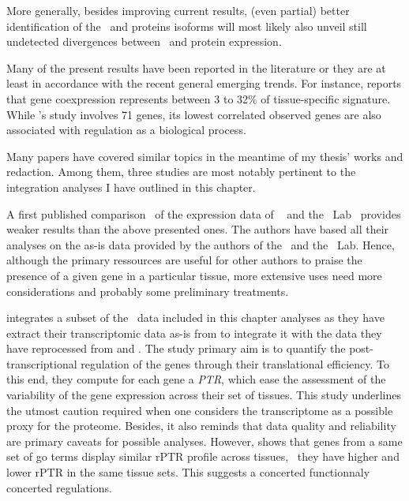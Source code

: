 More generally,
besides improving current results,
(even partial) better identification of the \mRNAs\ and proteins isoforms
will most likely also unveil still undetected divergences
between \mRNA\ and protein expression.\mybr\

Many of the present results have been reported in the literature
or they are at least in accordance with the recent general emerging trends.
For instance, \citet{Farahbod2019-fq} reports that
gene coexpression represents between 3 to 32\% of tissue-specific signature.
While \citet{Guo2008-wo}'s study involves 71 genes,
its lowest correlated observed genes are also associated
with regulation as a biological process.

Many papers have covered similar topics
in the meantime of my thesis' works and redaction.
Among them, three studies are most notably pertinent to the integration analyses
I have outlined in this chapter.

A first published comparison~ of the expression data of
\gtex\  and the \pandey\ Lab~
provides weaker results than the above presented ones.
The authors have based all their analyses on the as-is data provided
by the authors of the \gtex\ and the \pandey\ Lab.
Hence, although the primary ressources are useful
for other authors to praise the presence of a given gene in a particular tissue,
more extensive uses need more considerations
and probably some preliminary treatments.

\citet{Franks2017-bp} integrates a subset of the \uhlen\ data included
in this chapter analyses
as they have extract their transcriptomic data as-is from \citet{Uhlen2014}
to integrate it with the data they have reprocessed
from \citet{PandeyData} and \citet{KusterData}.
The study primary aim is
to quantify the post-transcriptional regulation of the genes
through their translational efficiency.
To this end, they compute for each gene a \emph{\gls{PTR}},
which ease the assessment of the variability of the gene expression
across their set of tissues.
This study underlines the utmost caution required
when one considers the transcriptome as a possible proxy for the proteome.
Besides, it also reminds that data quality and reliability are primary caveats
for possible analyses.
However, \citet{Franks2017-bp} shows that genes from a same set of \gls{go} terms
display similar \gls{rPTR} profile across tissues,
\ie\ they have higher and lower \gls{rPTR} in the same tissue sets.
This suggests a concerted functionnaly concerted regulations.


